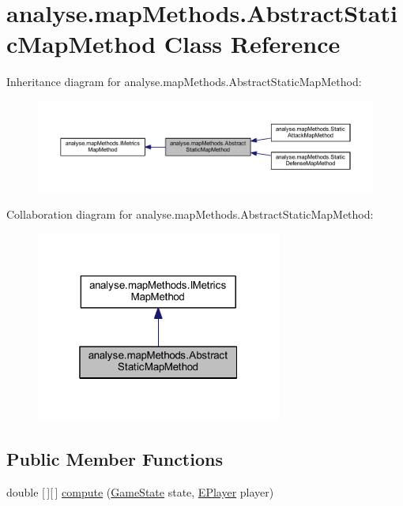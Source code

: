 \hypertarget{classanalyse_1_1map_methods_1_1_abstract_static_map_method}{}\section{analyse.\+map\+Methods.\+Abstract\+Static\+Map\+Method Class Reference}
\label{classanalyse_1_1map_methods_1_1_abstract_static_map_method}


Inheritance diagram for analyse.\+map\+Methods.\+Abstract\+Static\+Map\+Method\+:
\nopagebreak
\begin{figure}[H]
\begin{center}
\leavevmode
\includegraphics[width=350pt]{classanalyse_1_1map_methods_1_1_abstract_static_map_method__inherit__graph}
\end{center}
\end{figure}


Collaboration diagram for analyse.\+map\+Methods.\+Abstract\+Static\+Map\+Method\+:
\nopagebreak
\begin{figure}[H]
\begin{center}
\leavevmode
\includegraphics[width=229pt]{classanalyse_1_1map_methods_1_1_abstract_static_map_method__coll__graph}
\end{center}
\end{figure}
\subsection*{Public Member Functions}
\begin{DoxyCompactItemize}
\item 
double \mbox{[}$\,$\mbox{]}\mbox{[}$\,$\mbox{]} \mbox{\hyperlink{classanalyse_1_1map_methods_1_1_abstract_static_map_method_a314b86189e095a68a77027e051f0ea9c}{compute}} (\mbox{\hyperlink{classgame_1_1game_state_1_1_game_state}{Game\+State}} state, \mbox{\hyperlink{enumgame_1_1_e_player}{E\+Player}} player)
\end{DoxyCompactItemize}
